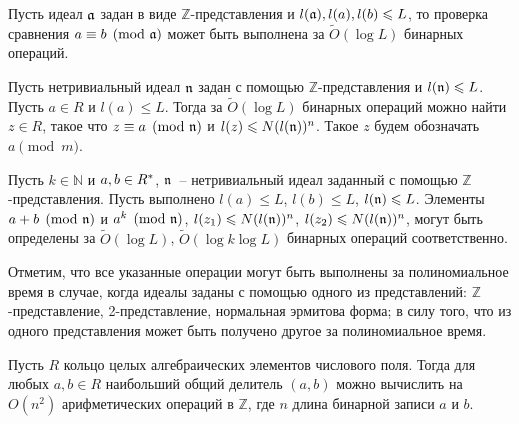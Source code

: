 \documentclass[_00_autoref.tex]{subfiles}
\begin{document}
\begin{proposition}\label{proposition:congruence}
    Пусть идеал $\mathfrak{a}$ задан в виде $\mathbb{Z}$-представления и $l(\mathfrak{a}), l(a), l(b) \leqslant L$, то проверка сравнения $a \equiv b \pmod{\mathfrak{a}}$ может быть выполнена за $\tilde{O}(\log L)$ бинарных операций.
\end{proposition}

\begin{proposition}\label{proposition:residue_modulo_ideal}
    Пусть нетривиальный идеал $\mathfrak{n}$ задан с помощью $\mathbb{Z}$-представления и $l(\mathfrak{n}) \leqslant L$.
    Пусть $a \in R$ и $l(a) \leq L$.
    Тогда за $\tilde{O}(\log L)$ бинарных операций можно найти $z \in R$, такое что $z \equiv a \pmod{\mathfrak{n}}$ и $l(z) \leqslant N (l(\mathfrak{n}))^n$.
    Такое $z$ будем обозначать $a \pmod{m}$.
\end{proposition}

\begin{corollary}
    Пусть $k \in \mathbb{N}$ и $a, b \in R^{*}$, $\mathfrak{n}$~-- нетривиальный идеал заданный с помощью $\mathbb{Z}$-представления.
    Пусть выполнено $l(a) \leq L$, $l(b) \leq L$, $l(\mathfrak{n}) \leqslant L$.
    Элементы $a + b \pmod{\mathfrak{n}}$ и $a^k \pmod{\mathfrak{n}}$, $l(z_1) \leqslant N (l(\mathfrak{n}))^n$, $l(z_2) \leqslant N (l(\mathfrak{n}))^n$, могут быть определены за $\tilde{O}(\log L)$, $\tilde{O}(\log k \log L)$  бинарных операций соответственно.
\end{corollary}

\begin{remark}
    Отметим, что все указанные операции могут быть выполнены за полиномиальное время в случае, когда идеалы заданы с помощью одного из представлений: $\mathbb{Z}$-представление, 2-представление, нормальная эрмитова форма; в силу того, что из одного представления может быть получено другое за полиномиальное время.
\end{remark}

\begin{statement}\label{statement:GCD_Wikstrom}
    Пусть $R$ кольцо целых алгебраических элементов числового поля.
    Тогда для любых $a, b \in R$ наибольший общий делитель $(a, b)$ можно вычислить на $O(n^2)$ арифметических операций в $\mathbb{Z}$, где $n$ длина бинарной записи $a$ и $b$.
\end{statement}
\end{document}
